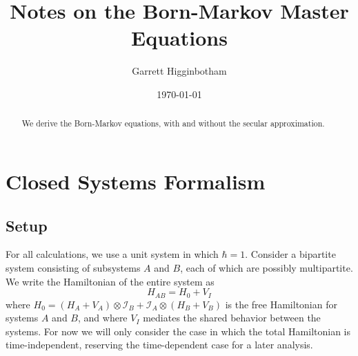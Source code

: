\documentclass[aps, prl, preprint]{revtex4-1}
\newcommand{\ten}{\otimes}
\newcommand{\I}{\mathcal{I}}
\begin{document}

\title{Notes on the Born-Markov Master Equations}
\author{Garrett Higginbotham}
\date{\today}
\begin{abstract}
We derive the Born-Markov equations, with and without the secular approximation.
\end{abstract}

%

\maketitle

\section{Closed Systems Formalism}

\subsection{Setup}

For all calculations, we use a unit system in which $\hbar = 1$. Consider a bipartite system consisting of subsystems $A$ and $B$, each of which are possibly multipartite. We write the Hamiltonian of the entire system as
\begin{equation}\label{ham}
H_{AB} = H_0 + V_I
\end{equation}
where $H_0 =  (H_A+V_A)\ten\I_B + \I_A\ten (H_B+V_B)$ is the free Hamiltonian for systems $A$ and $B$, and where $V_I$ mediates the shared behavior between the systems. For now we will only consider the case in which the total Hamiltonian is time-independent, reserving the time-dependent case for a later analysis.
\end{document}
